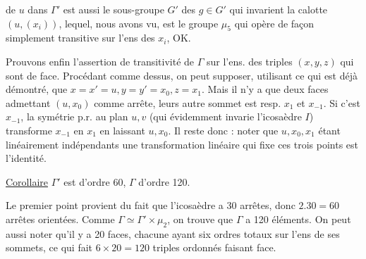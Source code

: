 \margin{Données équivalentes :
$\left\{\begin{array}{l}
\text{icosaèdre + un des sommets}\\
\text{icosaèdre + calotte d'icosaèdre contenue dedans}\\
\text{calotte d'icosaèdre}\\
\text{une couple }(u,v)\text{ modulo rotation sur }v\\
\quad\text{dans }u^\perp\text{ d'angle multiple de }\theta
\end{array}\right.$
[point du fibré principal sur $S$ de groupe $\mathbb T$ \unsure{de|,} puissance cinquième du fibré fourni \unsure{des|du} \unsure{$(u,v)$|$u,v$}, \unsure{soit|\ldots}}

de $u$ dans  $\Gamma'$ est aussi le sous-groupe  $G'$  des $g\in G'$ qui invarient la calotte $(u,(x_i))$, lequel, nous avons vu, est le groupe $\mu_5$ qui opère de façon simplement transitive sur l'ens des $x_i$, OK.

Prouvons enfin l'assertion de  transitivité de $\Gamma$ sur l'ens. des  triples $(x,y,z)$ qui sont de face. Procédant comme dessus, on peut supposer, utilisant ce qui est déjà démontré, que $x=x'=u,y=y'=x_0,z=x_1$. Mais il n'y a que deux  faces  admettant $(u,x_0)$ comme arrête, leurs autre sommet est resp. $x_1$ et $x_{-1}$. Si c'est $x_{-1}$, la symétrie p.r. au plan $u,v$ (qui évidemment invarie l'icosaèdre $I$) transforme $x_{-1}$ en $x_1$ en laissant $u,x_0$. Il reste donc :  noter que $u,x_0,x_1$  étant linéairement indépendants une transformation linéaire qui fixe ces trois points est l'identité.

\uline{Corollaire} $\Gamma'$ est d'ordre 60, $\Gamma$ d'ordre 120.

Le premier point provient du fait que l'icosaèdre a 30 arrêtes, donc $2.30=60$ arrêtes orientées. Comme $\Gamma\simeq\Gamma'\times\mu_2$, on trouve que $\Gamma$ a 120 éléments. On peut aussi noter qu'il y a 20 faces, chacune ayant  six ordres totaux sur l'ens de ses sommets, ce qui fait $6\times20=120$ triples ordonnés faisant face.

